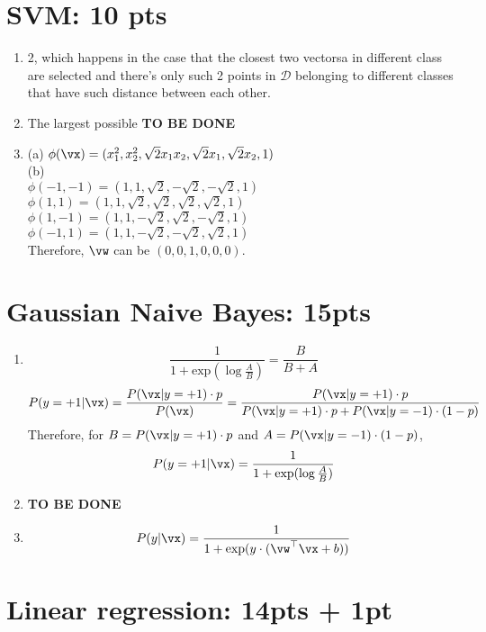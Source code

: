 \documentclass[12pt]{article}
\begin{document}
\section{SVM: 10 pts}
\begin{enumerate}
    \item 2, which happens in the case that the closest two vectorsa in different class are
    selected and there's only such 2 points in $\mathcal{D}$ belonging to different classes that have such distance between each other.
    \item The largest possible \bf{TO BE DONE}
    \item (a) $\phi(\vx) = (x_1^2, x_2^2, \sqrt2x_1x_2, \sqrt2x_1, \sqrt2x_2, 1)$\\
    (b) \\
    $\phi(-1, -1) = (1, 1, \sqrt2, -\sqrt2, -\sqrt2, 1)$\\
    $\phi(1, 1) = (1, 1, \sqrt2, \sqrt2, \sqrt2, \sqrt2, 1)$\\
    $\phi(1, -1) = (1, 1, -\sqrt2, \sqrt2, -\sqrt2, 1)$\\
    $\phi(-1, 1) = (1, 1, -\sqrt2, -\sqrt2, \sqrt2, 1)$\\
    Therefore, $\vw$ can be $(0, 0, 1, 0, 0, 0)$.
\end{enumerate}

\section{Gaussian Naive Bayes: 15pts}
\begin{enumerate}
    \item 
    \[\frac{1}{1+\text{exp}(\log\frac{A}{B})} = \frac{B}{B+A}\]
    \[P(y=+1|\vx) = \frac{P(\vx|y=+1) \cdot p}{P(\vx)} = \frac{P(\vx|y=+1) \cdot p}{P(\vx|y=+1) \cdot p + P(\vx|y=-1) \cdot (1-p)}\]
    Therefore, for $B = P(\vx|y=+1) \cdot p$ and $A = P(\vx|y=-1) \cdot (1-p)$, 
    \[P(y=+1|\vx) = \frac{1}{1+\text{exp}(\log\frac{A}{B})}\]
    \item \bf{TO BE DONE}
    \item \[P(y|\vx) = \frac{1}{1 + \text{exp}(y\cdot(\vw^{\top}\vx+b))}\]
\end{enumerate}

\section{Linear regression: 14pts + 1pt}
\end{document}
